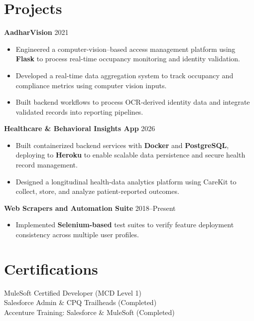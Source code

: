 \documentclass[letterpaper,11pt]{article}
\begin{document}
\section*{Projects}
\textbf{AadharVision} \hfill 2021
\begin{itemize}
\item Engineered a computer-vision–based access management platform using \textbf{Flask} to process real-time occupancy monitoring and identity validation.
\item Developed a real-time data aggregation system to track occupancy and compliance metrics using computer vision inputs.
\item Built backend workflows to process OCR-derived identity data and integrate validated records into reporting pipelines.
\end{itemize}

\textbf{Healthcare \& Behavioral Insights App} \hfill 2026
\begin{itemize}
\item Built containerized backend services with \textbf{Docker} and \textbf{PostgreSQL}, deploying to \textbf{Heroku} to enable scalable data persistence and secure health record management.
\item Designed a longitudinal health-data analytics platform using CareKit to collect, store, and analyze patient-reported outcomes.
\end{itemize}

\textbf{Web Scrapers and Automation Suite} \hfill 2018--Present
\begin{itemize}
\item Implemented \textbf{Selenium-based} test suites to verify feature deployment consistency across multiple user profiles.
\end{itemize}


\section*{Certifications}
MuleSoft Certified Developer (MCD Level 1) \\
Salesforce Admin \& CPQ Trailheads (Completed) \\
Accenture Training: Salesforce \& MuleSoft (Completed)
\end{document}
